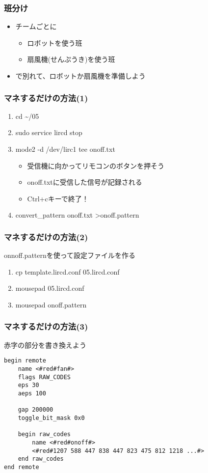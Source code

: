 \begin{frame}
    \frametitle{班分け}
    \begin{itemize}
        \item チームごとに
        \begin{itemize}
            \item ロボットを使う班
            \item 扇風機(せんぷうき)を使う班
        \end{itemize}
        \item で別れて、ロボットか扇風機を準備しよう
    \end{itemize}
\end{frame}

\begin{frame}
    \frametitle{マネするだけの方法(1)} 
    \begin{enumerate}
        \item cd \textasciitilde/05
        \item sudo service lircd stop
        \item mode2 -d /dev/lirc1 \textbar tee onoff.txt
        \begin{itemize}
            \item 受信機に向かってリモコンのボタンを押そう
            \item onoff.txtに受信した信号が記録される
            \item Ctrl+cキーで終了！
        \end{itemize}
        \item convert\_pattern onoff.txt \textgreater \space onoff.pattern
    \end{enumerate}
\end{frame}

\begin{frame}
    \frametitle{マネするだけの方法(2)} 
    onnoff.patternを使って設定ファイルを作る
    \begin{enumerate}
        \item cp template.lircd.conf 05.lircd.conf
        \item mousepad 05.lircd.conf
        \item mousepad onoff.pattern
    \end{enumerate}
\end{frame}

\begin{frame}[fragile]
    \frametitle{マネするだけの方法(3)}
    赤字の部分を書き換えよう
    \begin{lstlisting}
begin remote
    name <#red#fan#>
    flags RAW_CODES
    eps 30
    aeps 100

    gap 200000
    toggle_bit_mask 0x0
    
    begin raw_codes
        name <#red#onoff#>
        <#red#1207 588 447 838 447 823 475 812 1218 ...#>
    end raw_codes
end remote
    \end{lstlisting}
\end{frame}

